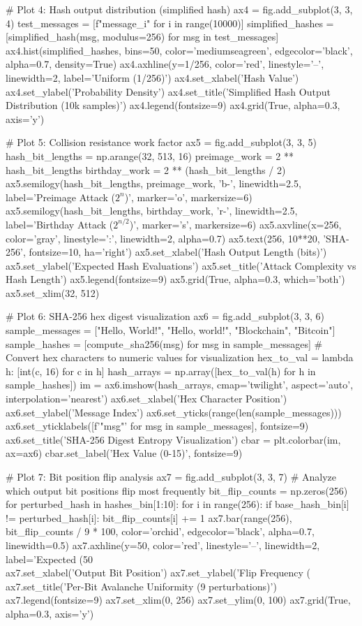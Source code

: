 \documentclass[a4paper, 11pt]{article}
\begin{document}
\begin{pycode}
# Plot 4: Hash output distribution (simplified hash)
ax4 = fig.add_subplot(3, 3, 4)
test_messages = [f"message_{i}" for i in range(10000)]
simplified_hashes = [simplified_hash(msg, modulus=256) for msg in test_messages]
ax4.hist(simplified_hashes, bins=50, color='mediumseagreen',
         edgecolor='black', alpha=0.7, density=True)
ax4.axhline(y=1/256, color='red', linestyle='--', linewidth=2,
            label='Uniform (1/256)')
ax4.set_xlabel('Hash Value')
ax4.set_ylabel('Probability Density')
ax4.set_title('Simplified Hash Output Distribution (10k samples)')
ax4.legend(fontsize=9)
ax4.grid(True, alpha=0.3, axis='y')

# Plot 5: Collision resistance work factor
ax5 = fig.add_subplot(3, 3, 5)
hash_bit_lengths = np.arange(32, 513, 16)
preimage_work = 2 ** hash_bit_lengths
birthday_work = 2 ** (hash_bit_lengths / 2)
ax5.semilogy(hash_bit_lengths, preimage_work, 'b-', linewidth=2.5,
             label='Preimage Attack ($2^n$)', marker='o', markersize=6)
ax5.semilogy(hash_bit_lengths, birthday_work, 'r-', linewidth=2.5,
             label='Birthday Attack ($2^{n/2}$)', marker='s', markersize=6)
ax5.axvline(x=256, color='gray', linestyle=':', linewidth=2, alpha=0.7)
ax5.text(256, 10**20, 'SHA-256', fontsize=10, ha='right')
ax5.set_xlabel('Hash Output Length (bits)')
ax5.set_ylabel('Expected Hash Evaluations')
ax5.set_title('Attack Complexity vs Hash Length')
ax5.legend(fontsize=9)
ax5.grid(True, alpha=0.3, which='both')
ax5.set_xlim(32, 512)

# Plot 6: SHA-256 hex digest visualization
ax6 = fig.add_subplot(3, 3, 6)
sample_messages = ["Hello, World!", "Hello, world!", "Blockchain", "Bitcoin"]
sample_hashes = [compute_sha256(msg) for msg in sample_messages]
# Convert hex characters to numeric values for visualization
hex_to_val = lambda h: [int(c, 16) for c in h]
hash_arrays = np.array([hex_to_val(h) for h in sample_hashes])
im = ax6.imshow(hash_arrays, cmap='twilight', aspect='auto', interpolation='nearest')
ax6.set_xlabel('Hex Character Position')
ax6.set_ylabel('Message Index')
ax6.set_yticks(range(len(sample_messages)))
ax6.set_yticklabels([f'"{msg}"' for msg in sample_messages], fontsize=9)
ax6.set_title('SHA-256 Digest Entropy Visualization')
cbar = plt.colorbar(im, ax=ax6)
cbar.set_label('Hex Value (0-15)', fontsize=9)

# Plot 7: Bit position flip analysis
ax7 = fig.add_subplot(3, 3, 7)
# Analyze which output bit positions flip most frequently
bit_flip_counts = np.zeros(256)
for perturbed_hash in hashes_bin[1:10]:
    for i in range(256):
        if base_hash_bin[i] != perturbed_hash[i]:
            bit_flip_counts[i] += 1
ax7.bar(range(256), bit_flip_counts / 9 * 100, color='orchid',
        edgecolor='black', alpha=0.7, linewidth=0.5)
ax7.axhline(y=50, color='red', linestyle='--', linewidth=2, label='Expected (50\\%
ax7.set_xlabel('Output Bit Position')
ax7.set_ylabel('Flip Frequency (\\%
ax7.set_title('Per-Bit Avalanche Uniformity (9 perturbations)')
ax7.legend(fontsize=9)
ax7.set_xlim(0, 256)
ax7.set_ylim(0, 100)
ax7.grid(True, alpha=0.3, axis='y')


\end{pycode}
\end{document}
